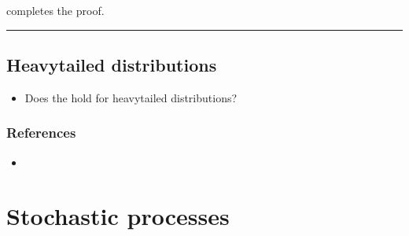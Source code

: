 \documentclass[letterpaper,10pt,english]{jupyterBook}
\begin{document}
\sphinxAtStartPar
{} completes the proof. 


\bigskip\hrule\bigskip


\sphinxstepscope


\section{Heavy\sphinxhyphen{}tailed distributions}
\label{\detokenize{ch/prob/heavy-tailed:heavy-tailed-distributions}}\label{\detokenize{ch/prob/heavy-tailed:prob-heavy-tailed}}\label{\detokenize{ch/prob/heavy-tailed::doc}}\begin{itemize}
\item {} 
\sphinxAtStartPar
Does the {\hyperref[\detokenize{ch/prob/iid:prob-iid-clt}]{}} hold for heavy\sphinxhyphen{}tailed distributions?

\end{itemize}


\subsection{References}
\label{\detokenize{ch/prob/heavy-tailed:references}}\begin{itemize}
\item {} 
\sphinxAtStartPar
{}

\end{itemize}

\sphinxstepscope


\chapter{Stochastic processes}
\label{\detokenize{ch/prob/processes:stochastic-processes}}\label{\detokenize{ch/prob/processes:prob-processes}}\label{\detokenize{ch/prob/processes::doc}}
\sphinxAtStartPar
{}
\end{document}
